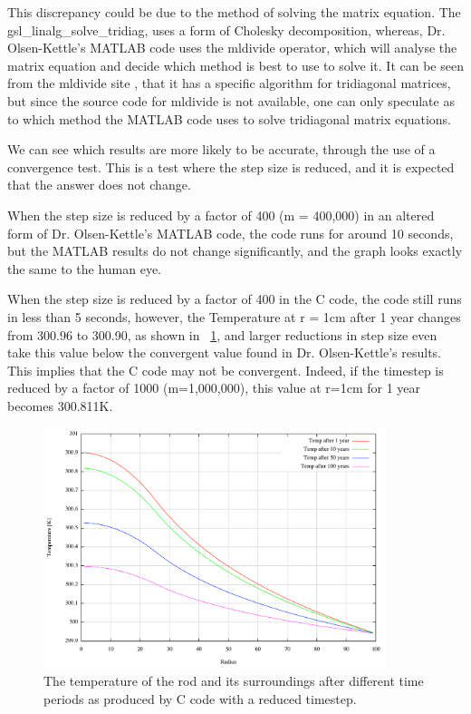 \documentclass{article}
\newcommand{\figref}[2][\figurename~]{#1\ref{#2}}
\begin{document}
This discrepancy could be due to the method of solving the matrix equation. The  gsl\_linalg\_solve\_tridiag, uses a form of Cholesky decomposition, whereas, Dr. Olsen-Kettle's MATLAB code uses the mldivide operator, which will analyse the matrix equation and decide which method is best to use to solve it. It can be seen from the mldivide site \cite{mldivide}, that it has a specific algorithm for tridiagonal matrices, but since the source code for mldivide is not available, one can only speculate as to which method the MATLAB code uses to solve tridiagonal matrix equations.

We can see which results are more likely to be accurate, through the use of a convergence test\cite{NumMethods}. This is a test where the step size is reduced, and it is expected that the answer does not change.

When the step size is reduced by a factor of 400 (m = 400,000) in an altered form of Dr. Olsen-Kettle's MATLAB code, the code runs for around 10 seconds, but the MATLAB results do not change significantly, and the graph looks exactly the same to the human eye.

When the step size is reduced by a factor of 400 in the C code, the code still runs in less than 5 seconds, however, the Temperature at r = 1cm after 1 year changes from 300.96 to 300.90, as shown in \figref{Tempred}, and larger reductions in step size even take this value below the convergent value found in Dr. Olsen-Kettle's results. This implies that the C code may not be convergent. Indeed, if the timestep is reduced by a factor of 1000 (m=1,000,000), this value at r=1cm for 1 year becomes 300.811K. 

\begin{figure}[htb]
\centering
\includegraphics[width=100mm]{Tempred.png}
\caption{The temperature of the rod and its surroundings after different time periods as produced by C code with a reduced timestep.}
\label{Tempred}
\end{figure}
\end{document}
